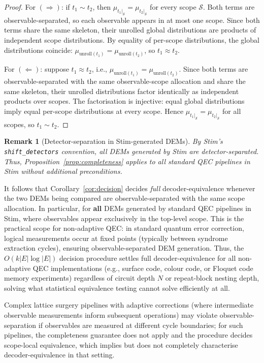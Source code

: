 \documentclass[11pt,a4paper]{article}
\newtheorem{remark}[theorem]{Remark}
\newcommand{\dist}[1]{\mu_{#1}}   %
\newcommand{\unroll}{\mathrm{unroll}} %
\begin{document}
\begin{proof}
For $(\Rightarrow)$: if $t_1 \sim t_2$, then $\dist{t_1|_{\mathcal{S}}} = \dist{t_2|_{\mathcal{S}}}$ for every scope $\mathcal{S}$. Both terms are observable-separated, so each observable appears in at most one scope. Since both terms share the same skeleton, their unrolled global distributions are products of independent scope distributions. By equality of per-scope distributions, the global distributions coincide:
$\dist{\unroll(t_1)} = \dist{\unroll(t_2)}$, so $t_1 \approx t_2$.

For $(\Leftarrow)$: suppose $t_1 \approx t_2$, i.e., $\dist{\unroll(t_1)} = \dist{\unroll(t_2)}$. Since both terms are observable-separated with the same observable-scope allocation and share the same skeleton, their unrolled distributions factor identically as independent products over scopes. The factorisation is injective: equal global distributions imply equal per-scope distributions at every scope. Hence $\dist{t_1|_{\mathcal{S}}} = \dist{t_2|_{\mathcal{S}}}$ for all scopes, so $t_1 \sim t_2$.
\end{proof}

\begin{remark}[Detector-separation in Stim-generated DEMs]
By Stim's \texttt{shift\_detectors} convention, all DEMs generated by Stim are 
detector-separated. Thus, Proposition~\ref{prop:completeness} 
applies to all standard QEC pipelines in Stim without additional preconditions.
\end{remark}

It follows that Corollary~\ref{cor:decision} decides \emph{full} decoder-equivalence whenever the two DEMs being compared are observable-separated with the same scope allocation. In particular, for \textbf{all} DEMs generated by standard QEC pipelines in Stim, where observables appear exclusively in the top-level scope. This is the practical scope for non-adaptive QEC: in standard quantum error correction, logical measurements occur at fixed points (typically between syndrome extraction cycles), ensuring observable-separated DEM generation. Thus, the $O(k|E|\log|E|)$ decision procedure settles full decoder-equivalence for all non-adaptive QEC implementations (e.g., surface code, colour code, or Floquet code memory experiments) regardless of circuit depth $N$ or repeat-block nesting depth, solving what statistical equivalence testing cannot solve efficiently at all.

Complex lattice surgery pipelines with adaptive corrections (where intermediate observable measurements inform subsequent operations) may violate observable-separation if observables are measured at different cycle boundaries; for such pipelines, the completeness guarantee does not apply and the procedure decides scope-local equivalence, which implies but does not completely characterise decoder-equivalence in that setting. 
\end{document}

